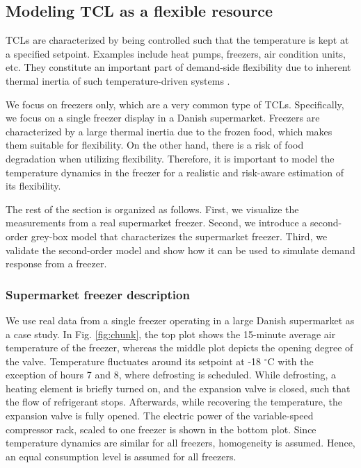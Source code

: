 \documentclass[11pt,a4paper]{article}
\begin{document}
\subsection{Modeling TCL as a flexible resource}
%
TCLs are characterized by being controlled such that the temperature is kept at a specified setpoint. Examples include heat pumps, freezers, air condition units, etc. They constitute an important part of demand-side flexibility due to  inherent thermal inertia of such temperature-driven systems \cite{hao2014aggregate}.

We focus on freezers only, which are a very common type of TCLs. Specifically, we focus on a single freezer display in a Danish supermarket. Freezers are characterized by a large thermal inertia due to the frozen food, which makes them suitable for flexibility. On the other hand, there is a risk of food degradation when utilizing flexibility. Therefore, it is important to model the temperature dynamics in the freezer for a realistic and risk-aware estimation of its flexibility.

The rest of the section is organized as follows. First, we visualize the measurements from a real supermarket freezer. Second, we introduce a second-order grey-box model that characterizes the supermarket freezer. Third, we validate the second-order model and show how it can be used to simulate demand response from a freezer.

\subsubsection{Supermarket freezer description}

We use real data from a single freezer operating in a large Danish supermarket as a case study.
In Fig. \ref{fig:chunk}, the top plot shows the 15-minute average air temperature of the freezer, whereas the middle plot depicts the opening degree of the valve.
%
Temperature fluctuates around its setpoint at -18 $^{\circ}$C with the exception of hours 7 and 8, where defrosting is scheduled.
While defrosting, a heating element is briefly turned on, and the expansion valve is closed, such that the flow of refrigerant stops. Afterwards, while recovering the temperature, the expansion valve is fully opened.
The electric power of the variable-speed compressor rack, scaled to one freezer is shown in the bottom plot. Since temperature dynamics are similar for all freezers, homogeneity is assumed. Hence, an equal consumption level is assumed for all freezers.
\end{document}
